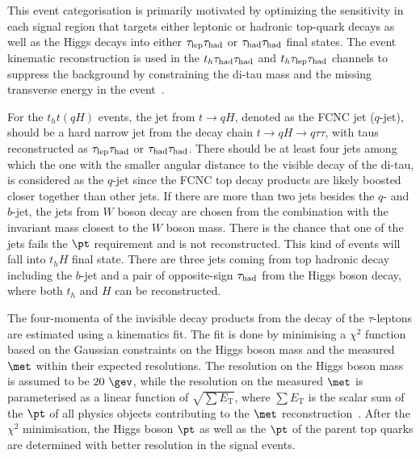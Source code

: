 This event categorisation is primarily motivated by optimizing the sensitivity in each signal region that targets either leptonic or hadronic top-quark
decays as well as the Higgs decays into either $\tau_{\mathrm{lep}} \tau_{\mathrm{had}}$ or $\tau_{\mathrm{had}} \tau_{\mathrm{had}}$ final states.   
The event kinematic reconstruction is used in the $t_h\tau_{\mathrm{had}} \tau_{\mathrm{had}}$ and $t_h\tau_{\mathrm{lep}} \tau_{\mathrm{had}}$ channels to suppress the background by constraining the
di-tau mass and the missing transverse energy in the event~\cite{Chen:2015nta}.


For the $t_ht(qH)$ events, the jet from $t\to qH$, denoted as the FCNC jet ($q$-jet), should be a hard narrow jet from the
decay chain $t\to qH\to q\tau\tau$, with taus reconstructed as $\tau_{\mathrm{lep}} \tau_{\mathrm{had}}$ or $\tau_{\mathrm{had}} \tau_{\mathrm{had}}$.
There should be at least four jets among which the one with the smaller angular distance to the visible decay of the di-tau,
is considered as the $q$-jet since the FCNC top decay products are likely boosted closer together than other jets. 
If there are more than two jets besides the $q$- and $b$-jet, the jets from $W$ boson decay are chosen from the combination
with the invariant mass closest to the $W$ boson mass. There is the chance that one of the jets fails the $\pt$ requirement and is not reconstructed.
This kind of events will fall into $t_hH$ final state.
There are three jets coming from top hadronic decay including the $b$-jet and a pair of opposite-sign $\tau_{\mathrm{had}}$ from the Higgs boson decay, where
both $t_h$ and $H$ can be reconstructed.  

The four-momenta of the invisible decay products from the decay of the $\tau$-leptons 
are estimated using a kinematics fit. The fit is done by minimising a $\chi^2$ function based on the Gaussian constraints on the Higgs boson mass and the
measured $\met$ within their expected resolutions. The resolution on the Higgs boson mass is assumed to be $20~\gev$, while the resolution on the measured $\met$ is parameterised as a linear function of 
$\sqrt{\sum E_{\text{T}}}$, where $\sum E_{\text{T}}$ is the scalar sum of the $\pt$ of all physics objects contributing to the $\met$ reconstruction~\cite{Aaboud:2018tkc}.
After the $\chi^2$ minimisation, the Higgs boson $\pt$ as well as the 
$\pt$ of the parent top quarks are determined with better resolution in the signal events. 

